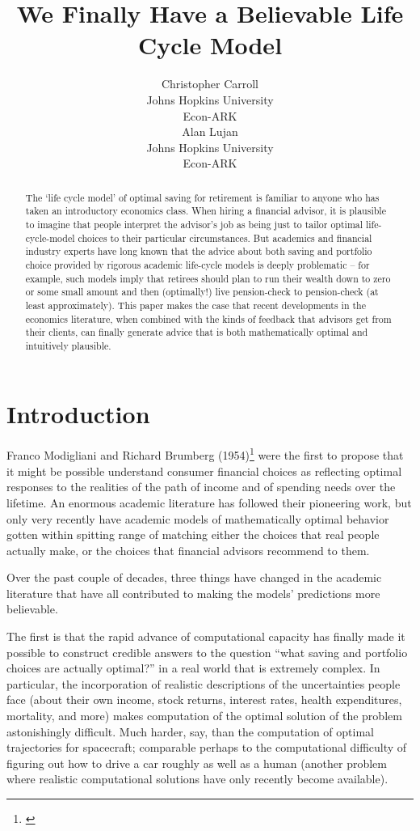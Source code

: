 \documentclass{article}
\title{We Finally Have a Believable Life Cycle Model}
\date{\displaydate{articleDate}}
\author{Christopher Carroll\footnotemark[1]\\
Johns Hopkins University\\Econ-ARK\\\AND
Alan Lujan\\
Johns Hopkins University\\Econ-ARK\\}
\begin{document}
\maketitle
{}

\begin{abstract}
The `life cycle model' of optimal saving for retirement is familiar to anyone who has taken an introductory economics class. When hiring a financial advisor, it is plausible to imagine that people interpret the advisor's job as being just to tailor optimal life-cycle-model choices to their particular circumstances. But academics and financial industry experts have long known that the advice about both saving and portfolio choice provided by rigorous academic life-cycle models is deeply problematic -- for example, such models imply that retirees should plan to run their wealth down to zero or some small amount and then (optimally!) live pension-check to pension-check (at least approximately). This paper makes the case that recent developments in the economics literature, when combined with the kinds of feedback that advisors get from their clients, can finally generate advice that is both mathematically optimal and intuitively plausible.
\end{abstract}

\keywords{}

\section{Introduction}

Franco Modigliani and Richard Brumberg (1954)\footnote{\cite{2005}} were the first to propose that it might be possible understand consumer financial choices as reflecting optimal responses to the realities of the path of income and of spending needs over the lifetime. An enormous academic literature has followed their pioneering work, but only very recently have academic models of mathematically optimal behavior gotten within spitting range of matching either the choices that real people actually make, or the choices that financial advisors recommend to them.

Over the past couple of decades, three things have changed in the academic literature that have all contributed to making the models' predictions more believable.

The first is that the rapid advance of computational capacity has finally made it possible to construct credible answers to the question ``what saving and portfolio choices are actually optimal?'' in a real world that is extremely complex. In particular, the incorporation of realistic descriptions of the uncertainties people face (about their own income, stock returns, interest rates, health expenditures, mortality, and more) makes computation of the optimal solution of the problem astonishingly difficult. Much harder, say, than the computation of optimal trajectories for spacecraft; comparable perhaps to the computational difficulty of figuring out how to drive a car roughly as well as a human (another problem where realistic computational solutions have only recently become available).
\end{document}
